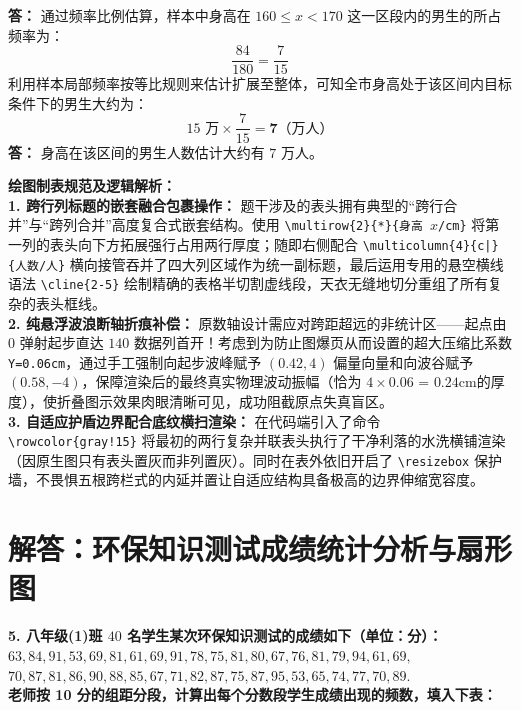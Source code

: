 \documentclass[12pt, a4paper]{ctexrep}
\begin{document}
\vspace{0.2cm}
\textbf{答：} 通过频率比例估算，样本中身高在 $160 \leqslant x < 170$ 这一区段内的男生的所占频率为：
$$\frac{84}{180} = \frac{7}{15}$$
利用样本局部频率按等比规则来估计扩展至整体，可知全市身高处于该区间内目标条件下的男生大约为：
$$15\text{ 万} \times \frac{7}{15} = \boldsymbol{7}\text{（万人）}$$
\textbf{答：} 身高在该区间的男生人数估计大约有 $7$ 万人。

\vspace{0.6cm}

{\small\color{blue!70!black}
\textbf{绘图制表规范及逻辑解析：}\\
\textbf{1. 跨行列标题的嵌套融合包裹操作：} 题干涉及的表头拥有典型的“跨行合并”与“跨列合并”高度复合式嵌套结构。使用 \texttt{\textbackslash multirow\{2\}\{*\}\{身高 $x$/cm\}} 将第一列的表头向下方拓展强行占用两行厚度；随即右侧配合 \texttt{\textbackslash multicolumn\{4\}\{c|\}\{人数/人\}} 横向接管吞并了四大列区域作为统一副标题，最后运用专用的悬空横线语法 \texttt{\textbackslash cline\{2-5\}} 绘制精确的表格半切割虚线段，天衣无缝地切分重组了所有复杂的表头框线。\\
\textbf{2. 纯悬浮波浪断轴折痕补偿：} 原数轴设计需应对跨距超远的非统计区——起点由 $0$ 弹射起步直达 $140$ 数据列首开！考虑到为防止图爆页从而设置的超大压缩比系数 \texttt{Y=0.06cm}，通过手工强制向起步波峰赋予 $(0.42, 4)$ 偏量向量和向波谷赋予 $(0.58, -4)$，保障渲染后的最终真实物理波动振幅（恰为 $4 \times 0.06$ = $0.24\text{cm}$的厚度），使折叠图示效果肉眼清晰可见，成功阻截原点失真盲区。\\
\textbf{3. 自适应护盾边界配合底纹横扫渲染：} 在代码端引入了命令 \texttt{\textbackslash rowcolor\{gray!15\}} 将最初的两行复杂并联表头执行了干净利落的水洗横铺渲染（因原生图只有表头置灰而非列置灰）。同时在表外依旧开启了 \texttt{\textbackslash resizebox} 保护墙，不畏惧五根跨栏式的内延并置让自适应结构具备极高的边界伸缩宽容度。
}

\newpage

\section{解答：环保知识测试成绩统计分析与扇形图}

\vspace{0.6cm}

\textbf{5. 八年级(1)班 $40$ 名学生某次环保知识测试的成绩如下（单位：分）：\\
$63, 84, 91, 53, 69, 81, 61, 69, 91, 78, 75, 81, 80, 67, 76, 81, 79, 94, 61, 69,$ \\
$70, 87, 81, 86, 90, 88, 85, 67, 71, 82, 87, 75, 87, 95, 53, 65, 74, 77, 70, 89.$ \\
老师按 10 分的组距分段，计算出每个分数段学生成绩出现的频数，填入下表：}
\end{document}
